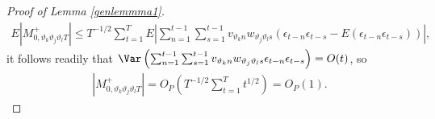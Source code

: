 {{\begin{proof}[Proof of Lemma \ref{genlemmma1}]
\begin{align*}
    E |M^+_{0,\vartheta_k \vartheta_j \vartheta_l  T} | \leq T^{-1/2} \sum_{t = 1}^T E \left| \sum_{n = 1}^{t-1} \sum_{s = 1}^{t-1} v_{\vartheta_k n} w_{ \vartheta_j \vartheta_l  s} \left( \epsilon_{t-n} \epsilon_{t-s} - E \left(\epsilon_{t-n} \epsilon_{t-s} \right)  \right) \right|,
\end{align*}
it follows readily that $\Var \left( \sum_{n = 1}^{t-1} \sum_{s = 1}^{t-1} v_{\vartheta_k n} w_{ \vartheta_j \vartheta_l  s} \epsilon_{t-n} \epsilon_{t-s} \right) = O(t)$, so
\begin{align*}
    |M^+_{0,\vartheta_k \vartheta_j \vartheta_l  T} | = O_P( T^{-1/2} \sum_{t = 1}^T t^{1/2}) = O_P(1).
\end{align*}


\end{proof}







}}
